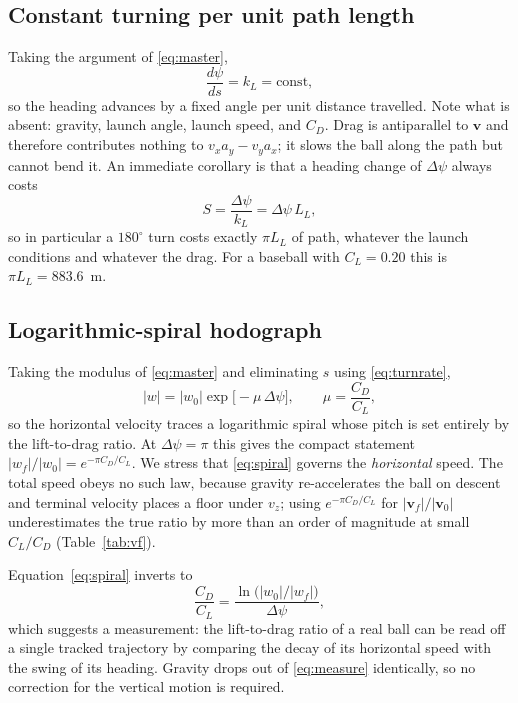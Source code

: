 \documentclass[aip,amsmath,amssymb,preprint,floatfix]{revtex4-2}
\newcommand{\kL}{k_{L}}
\newcommand{\LL}{L_{L}}
\newcommand{\vv}{\bm{v}}
\begin{document}
\subsection{Constant turning per unit path length}

Taking the argument of \eqref{eq:master},
\begin{equation}
\frac{d\psi}{ds} = \kL = \text{const},
\label{eq:turnrate}
\end{equation}
so the heading advances by a fixed angle per unit distance travelled. Note what is
absent: gravity, launch angle, launch speed, and $C_D$. Drag is antiparallel to
$\vv$ and therefore contributes nothing to $v_xa_y-v_ya_x$; it slows the ball along
the path but cannot bend it. An immediate corollary is that a heading change of
$\Delta\psi$ always costs
\begin{equation}
S = \frac{\Delta\psi}{\kL} = \Delta\psi\,\LL ,
\label{eq:pathlength}
\end{equation}
so in particular a $180^\circ$ turn costs exactly $\pi\LL$ of path, whatever the
launch conditions and whatever the drag. For a baseball with $C_L=0.20$ this is
$\pi\LL=883.6$~m.

\subsection{Logarithmic-spiral hodograph}

Taking the modulus of \eqref{eq:master} and eliminating $s$ using
\eqref{eq:turnrate},
\begin{equation}
|w| = |w_0|\exp\!\bigl[-\mu\,\Delta\psi\bigr],\qquad \mu=\frac{C_D}{C_L},
\label{eq:spiral}
\end{equation}
so the horizontal velocity traces a logarithmic spiral whose pitch is set entirely
by the lift-to-drag ratio. At $\Delta\psi=\pi$ this gives the compact statement
$|w_f|/|w_0|=e^{-\pi C_D/C_L}$. We stress that \eqref{eq:spiral} governs the
\emph{horizontal} speed. The total speed obeys no such law, because gravity
re-accelerates the ball on descent and terminal velocity places a floor under $v_z$;
using $e^{-\pi C_D/C_L}$ for $|\vv_f|/|\vv_0|$ underestimates the true ratio by more
than an order of magnitude at small $C_L/C_D$ (Table~\ref{tab:vf}).

Equation~\eqref{eq:spiral} inverts to
\begin{equation}
\frac{C_D}{C_L} = \frac{\ln\bigl(|w_0|/|w_f|\bigr)}{\Delta\psi},
\label{eq:measure}
\end{equation}
which suggests a measurement: the lift-to-drag ratio of a real ball can be read off
a single tracked trajectory by comparing the decay of its horizontal speed with the
swing of its heading. Gravity drops out of \eqref{eq:measure} identically, so no
correction for the vertical motion is required.
\end{document}
